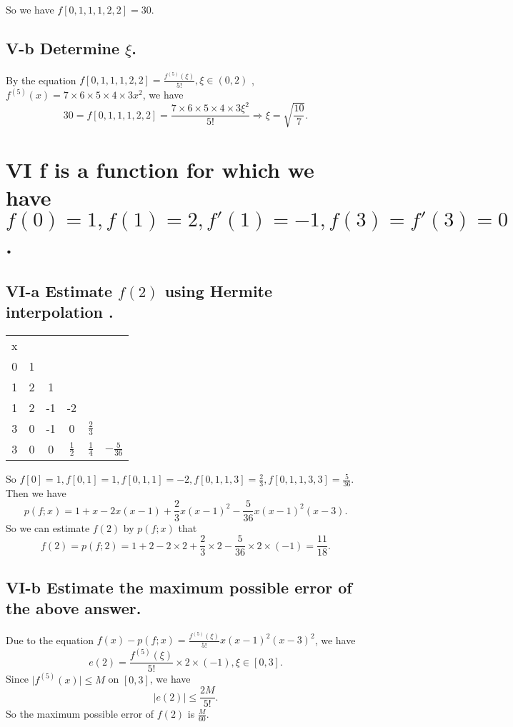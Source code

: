 \documentclass[twoside,a4paper]{article}
\begin{document}
So we have $f[0,1,1,1,2,2]=30$.

\subsection*{V-b \small{Determine $\xi$.}}

By the equation $f[0,1,1,1,2,2]=\frac{f^{\left( 5 \right)}\left( \xi \right)}{5!},\xi\in\left( 0,2 \right) $
, $f^{\left( 5 \right)}\left( x \right) =7\times6\times5\times4\times3x^{2} $, we have
\[
	30=f[0,1,1,1,2,2]=\frac{7\times6\times5\times4\times3\xi^{2}}{5!}\Rightarrow\xi=\sqrt{\frac{10}{7}}  
.\] 

\section*{VI \small{f is a function for which we have 
$f\left( 0 \right)=1,f\left( 1 \right)=2,f'\left(  1\right)=-1,f\left(  3\right)=f'\left( 3 \right)=0$.}}

\subsection*{VI-a \small{Estimate $f\left( 2 \right)$ using Hermite interpolation .}}

\begin{tabular}{c|ccccc}
x\\
0&1\\
1&2&1\\
1&2&-1&-2\\
3&0&-1& 0           &$\frac{2}{3}$\\
3&0&0 &$\frac{1}{2}$&$\frac{1}{4}$&$-\frac{5}{36}$ \\
\end{tabular}

So $f[0]=1,f[0,1]=1,f[0,1,1]=-2,f[0,1,1,3]=\frac{2}{3},f[0,1,1,3,3]=\frac{5}{36}$. Then we have
\[
	p\left( f;x \right)=1+x-2x\left( x-1 \right)+\frac{2}{3}x\left( x-1 \right)^2-\frac{5}{36}x\left( x-1 \right)^2\left( x-3 \right)     
.\] 
So we can estimate $f\left( 2 \right) $ by $p\left( f;x \right) $ that 
\[
	f\left( 2 \right)=p\left(  f;2\right)=1+2-2\times2+\frac{2}{3}\times2-\frac{5}{36}\times 2\times\left( -1 \right)=\frac{11}{18}   
.\] 
\subsection*{VI-b \small{Estimate the maximum possible error of the above answer.}}

Due to the equation $f\left( x \right)-p\left( f;x \right)=\frac{f^{\left( 5 \right) }\left( \xi \right) }{5!}x\left( x-1 \right)^2\left( x-3 \right)^2$, we have
\[
	e\left( 2 \right)=\frac{f^{\left( 5 \right) }\left( \xi \right) }{5!}\times 2\times\left( -1 \right)  ,\xi\in[0,3]
.\] 
Since $ \mid  f^{\left( 5 \right) }\left( x \right) \mid\le M$ on $[0,3]$, we have
\[
	 \mid e\left( 2 \right) \mid \le \frac{2M}{5!}  
.\]
So the maximum possible error of $f\left( 2 \right) $ is $\frac{M}{60}$.
\end{document}
